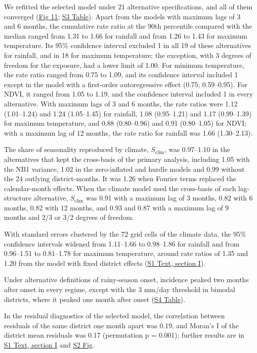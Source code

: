 \documentclass[11pt,a4paper]{article}
\begin{document}
We refitted the selected model under 21 alternative specifications, and all of them converged (\hyperref[fig11]{Fig 11}; \hyperref[s3table]{S3 Table}). Apart from the models with maximum lags of 3 and 6 months, the cumulative rate ratio at the 90th percentile compared with the median ranged from 1.31 to 1.66 for rainfall and from 1.26 to 1.43 for maximum temperature. Its 95\% confidence interval excluded 1 in all 19 of these alternatives for rainfall, and in 18 for maximum temperature; the exception, with 3 degrees of freedom for the exposure, had a lower limit of 1.00. For minimum temperature, the rate ratio ranged from 0.75 to 1.09, and its confidence interval included 1 except in the model with a first-order autoregressive effect (0.75; 0.59--0.95). For NDVI, it ranged from 1.05 to 1.19, and the confidence interval included 1 in every alternative. With maximum lags of 3 and 6 months, the rate ratios were 1.12 (1.01--1.24) and 1.24 (1.05--1.45) for rainfall, 1.08 (0.95--1.21) and 1.17 (0.99--1.39) for maximum temperature, and 0.88 (0.80--0.96) and 0.91 (0.80--1.05) for NDVI; with a maximum lag of 12 months, the rate ratio for rainfall was 1.66 (1.30--2.13).

The share of seasonality reproduced by climate, \(S_{\text{clim}}\), was 0.97--1.10 in the alternatives that kept the cross-basis of the primary analysis, including 1.05 with the NB1 variance, 1.02 in the zero-inflated and hurdle models and 0.99 without the 24 outlying district-months. It was 1.26 when Fourier terms replaced the calendar-month effects. When the climate model used the cross-basis of each lag-structure alternative, \(S_{\text{clim}}\) was 0.91 with a maximum lag of 3 months, 0.82 with 6 months, 0.82 with 12 months, and 0.93 and 0.87 with a maximum lag of 9 months and 2/3 or 3/2 degrees of freedom.

With standard errors clustered by the 72 grid cells of the climate data, the 95\% confidence intervals widened from 1.11--1.66 to 0.98--1.86 for rainfall and from 0.96--1.51 to 0.81--1.78 for maximum temperature, around rate ratios of 1.35 and 1.20 from the model with fixed district effects (\hyperref[s1text-i]{S1 Text, section I}).

Under alternative definitions of rainy-season onset, incidence peaked two months after onset in every regime, except with the 3 mm/day threshold in bimodal districts, where it peaked one month after onset (\hyperref[s4table]{S4 Table}).

In the residual diagnostics of the selected model, the correlation between residuals of the same district one month apart was 0.19, and Moran's I of the district mean residuals was 0.17 (permutation p = 0.001); further results are in \hyperref[s1text-i]{S1 Text, section I} and \hyperref[s2fig]{S2 Fig}.
\end{document}
